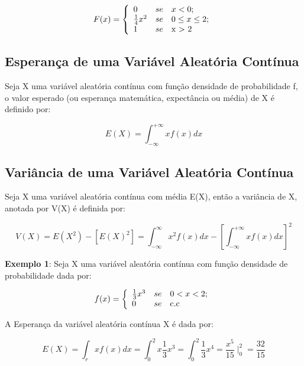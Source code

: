 $$
F(x)=
\left\{%
\begin{array}{ll}
    0                 & se \quad \hbox{$x < 0$;} \\
   \frac{1}{4}x^{2}   & se \quad \hbox{$0 \leq x \leq 2$;} \\
   1                  & se \quad \hbox{x > 2} \\
\end{array}%
\right.
$$


\subsection{Esperança de uma Variável Aleatória Contínua}

Seja X uma variável aleatória contínua com função densidade de
probabilidade f, o valor esperado (ou esperança matemática,
expectância ou média) de X é definido por:


\begin{equation}\label{}
    E(X)=\int_{-\infty}^{+\infty}xf(x)dx
\end{equation}


\subsection{Variância de uma Variável Aleatória Contínua}

Seja X uma variável aleatória contínua com média E(X), então a
variância de X, anotada por V(X) é definida por:


\begin{equation}\label{}
V(X) = E(X^{2})-[E(X)^{2}]= \int_{-\infty}^{\infty}x^{2}f(x)dx
-\left[\int_{-\infty}^{+\infty}xf(x)dx\right]^{2}
\end{equation}


\textbf{Exemplo 1}: Seja X uma variável aleatória contínua com
função densidade de probabilidade dada por:

$$
f(x)=
\left\{%
\begin{array}{ll}
   \frac{1}{3}x^{3}   & se \quad \hbox{$0 < x < 2$;} \\
   0                  & se \quad \hbox{c.c} \\
\end{array}%
\right.
$$

A Esperança da variável aleatória contínua X é dada por:

$$
E(X)= \int_{r} xf(x)dx = \int^{2}_{0}x\frac{1}{3}x^{3} =
\int^{2}_{0}\frac{1}{3}x^{4} = \frac{x^{5}}{15}\mid^{2}_{0}=
\frac{32}{15}
$$


